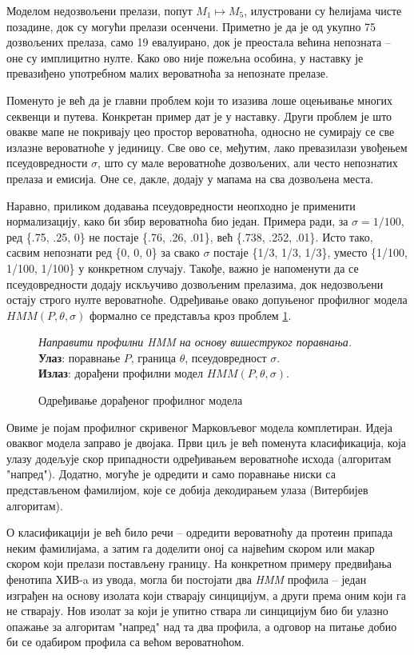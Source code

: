 \documentclass[12pt,oneside]{memoir}
\newenvironment{problem}[1][!ht]
{\renewcommand{\algorithmcfname}{Проблем}
\begin{figure}[!ht]
\centering
  \begin{minipage}{.94\linewidth}
	\begin{algorithm}[#1]%
  }{\end{algorithm}
  \end{minipage}
\end{figure}}
\begin{document}
\begin{CJK}{UTF8}{ipxm}
Моделом недозвољени прелази, попут $M_1 \mapsto M_5$, илустровани су ћелијама чисте позадине, док су могући прелази осенчени. Приметно је да је од укупно 75 дозвољених прелаза, само 19 евалуирано, док је преостала већина непозната -- оне су имплицитно нулте. Како ово није пожељна особина, у наставку је превазиђено употребном малих вероватноћа за непознате прелазе.

Поменуто је већ да је главни проблем који то изазива лоше оцењивање многих секвенци и путева. Конкретан пример дат је у наставку. Други проблем је што овакве мапе не покривају цео простор вероватноћа, односно не сумирају се све излазне вероватноће у јединицу. Све ово се, међутим, лако превазилази увођењем псеудовредности $\sigma$, што су мале вероватноће дозвољених, али често непознатих прелаза и емисија. Оне се, дакле, додају у мапама на сва дозвољена места.

Наравно, приликом додавања псеудовредности неопходно је применити нормализацију, како би збир вероватноћа био један. Примера ради, за $\sigma = 1/100$, ред \{.75, .25, 0\} не постаје \{.76, .26, .01\}, већ \{.738, .252, .01\}. Исто тако, сасвим непознати ред \{0, 0, 0\} за свако $\sigma$ постаје \{1/3, 1/3, 1/3\}, уместо \{1/100, 1/100, 1/100\} у конкретном случају. Такође, важно је напоменути да се псеудовредности додају искључиво дозвољеним прелазима, док недозвољени остају строго нулте вероватноће. Одређивање овако допуњеног профилног модела $HMM(P, \theta, \sigma)$ формално се представља кроз проблем \ref{prob:prof_sigma}.

\begin{problem}[H]
  \SetAlgoLined
  \textit{Направити профилни \textit{HMM} на основу вишеструког поравнања.}\\
  \textbf{Улаз}: поравнање $P$, граница $\theta$, псеудовредност $\sigma$.\\
  \textbf{Излаз}: дорађени профилни модел $HMM(P, \theta, \sigma)$.
  \caption{Одређивање дорађеног профилног модела \cite{ba10f}}
  \label{prob:prof_sigma}
\end{problem}

Овиме је појам профилног скривеног Марковљевог модела комплетиран. Идеја оваквог модела заправо је двојака. Први циљ је већ поменута класификација, која улазу додељује скор припадности одређивањем вероватноће исхода (алгоритам "напред"). Додатно, могуће је одредити и само поравнање ниски са представљеном фамилијом, које се добија декодирањем улаза (Витербијев алгоритам).

О класификацији је већ било речи -- одредити вероватноћу да протеин припада неким фамилијама, а затим га доделити оној са највећим скором или макар скором који прелази постављену границу. На конкретном примеру предвиђања фенотипа ХИВ-a из увода, могла би постојати два \textit{HMM} профила -- један изграђен на основу изолата који стварају синцицијум, а други према оним који га не стварају. Нов изолат за који је упитно ствара ли синцицијум био би улазно опажање за алгоритам "напред" над та два профила, а одговор на питање добио би се одабиром профила са већом вероватноћом.


\end{CJK}
\end{document}
